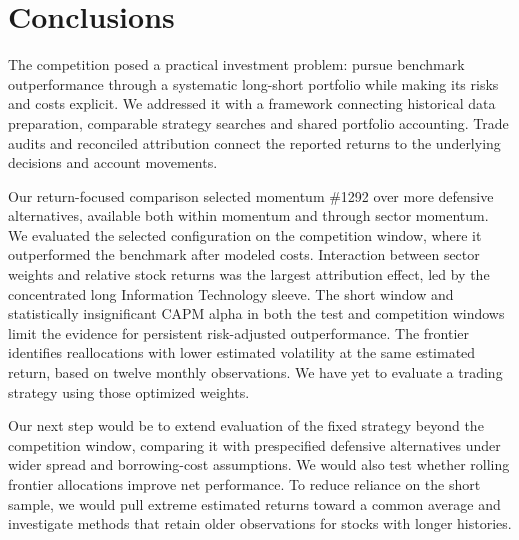 \section{Conclusions}
\label{sec:discussion}

The competition posed a practical investment problem: pursue benchmark
outperformance through a systematic long-short portfolio while making its
risks and costs explicit. We addressed it with a framework connecting
historical data preparation, comparable strategy searches and shared portfolio
accounting. Trade audits and reconciled attribution connect the reported
returns to the underlying decisions and account movements.

Our return-focused comparison selected momentum \#1292 over more defensive
alternatives, available both within momentum and through sector momentum.
We evaluated the selected configuration on the competition window, where it
outperformed the benchmark after modeled costs. Interaction between sector
weights and relative stock returns was the largest attribution effect, led by
the concentrated long Information Technology sleeve. The short window and statistically insignificant
CAPM alpha in both the test and competition windows limit the evidence for
persistent risk-adjusted outperformance. The frontier identifies reallocations
with lower estimated volatility at the same estimated return, based on twelve
monthly observations. We have yet to evaluate a trading strategy using those
optimized weights.

Our next step would be to extend evaluation of the fixed strategy beyond
the competition window, comparing it with prespecified defensive alternatives
under wider spread and borrowing-cost assumptions. We would also test whether
rolling frontier allocations improve net performance. To reduce reliance on
the short sample, we would pull extreme estimated returns toward a common
average and investigate methods that retain older observations for stocks with
longer histories.
